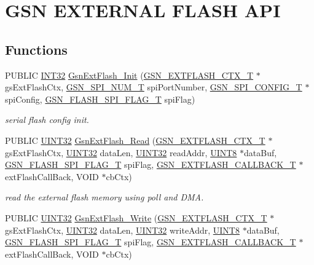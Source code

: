 \hypertarget{a00664}{
\section{GSN EXTERNAL FLASH API}
\label{a00664}
}
\subsection*{Functions}
\begin{DoxyCompactItemize}
\item 
PUBLIC \hyperlink{a00660_ga63021d67d54286c2163bcdb43a6f2569}{INT32} \hyperlink{a00664_gadcfa064597618fbf7cb4c1bac30f4bc8}{GsnExtFlash\_\-Init} (\hyperlink{a00071}{GSN\_\-EXTFLASH\_\-CTX\_\-T} $\ast$gsExtFlashCtx, \hyperlink{a00587_a8158d263babcdfe1b3b113e23acd1bf7}{GSN\_\-SPI\_\-NUM\_\-T} spiPortNumber, \hyperlink{a00231}{GSN\_\-SPI\_\-CONFIG\_\-T} $\ast$spiConfig, \hyperlink{a00496_ae69f658e2fd080c54a78eb23e4be2f59}{GSN\_\-FLASH\_\-SPI\_\-FLAG\_\-T} spiFlag)
\begin{DoxyCompactList}\small\item\em serial flash config init. \end{DoxyCompactList}\item 
PUBLIC \hyperlink{a00660_gae1e6edbbc26d6fbc71a90190d0266018}{UINT32} \hyperlink{a00664_ga969314425ebd66d21301f5e2a681dee3}{GsnExtFlash\_\-Read} (\hyperlink{a00071}{GSN\_\-EXTFLASH\_\-CTX\_\-T} $\ast$gsExtFlashCtx, \hyperlink{a00660_gae1e6edbbc26d6fbc71a90190d0266018}{UINT32} dataLen, \hyperlink{a00660_gae1e6edbbc26d6fbc71a90190d0266018}{UINT32} readAddr, \hyperlink{a00660_gab27e9918b538ce9d8ca692479b375b6a}{UINT8} $\ast$dataBuf, \hyperlink{a00496_ae69f658e2fd080c54a78eb23e4be2f59}{GSN\_\-FLASH\_\-SPI\_\-FLAG\_\-T} spiFlag, \hyperlink{a00496_a501e29be4c0f8b2ab5c186eb8deb8874}{GSN\_\-EXTFLASH\_\-CALLBACK\_\-T} $\ast$extFlashCallBack, VOID $\ast$cbCtx)
\begin{DoxyCompactList}\small\item\em read the external flash memory using poll and DMA. \end{DoxyCompactList}\item 
PUBLIC \hyperlink{a00660_gae1e6edbbc26d6fbc71a90190d0266018}{UINT32} \hyperlink{a00664_ga1e65016bc9bc6e7f219148b64b94213e}{GsnExtFlash\_\-Write} (\hyperlink{a00071}{GSN\_\-EXTFLASH\_\-CTX\_\-T} $\ast$gsExtFlashCtx, \hyperlink{a00660_gae1e6edbbc26d6fbc71a90190d0266018}{UINT32} dataLen, \hyperlink{a00660_gae1e6edbbc26d6fbc71a90190d0266018}{UINT32} writeAddr, \hyperlink{a00660_gab27e9918b538ce9d8ca692479b375b6a}{UINT8} $\ast$dataBuf, \hyperlink{a00496_ae69f658e2fd080c54a78eb23e4be2f59}{GSN\_\-FLASH\_\-SPI\_\-FLAG\_\-T} spiFlag, \hyperlink{a00496_a501e29be4c0f8b2ab5c186eb8deb8874}{GSN\_\-EXTFLASH\_\-CALLBACK\_\-T} $\ast$extFlashCallBack, VOID $\ast$cbCtx)

\end{DoxyCompactItemize}

